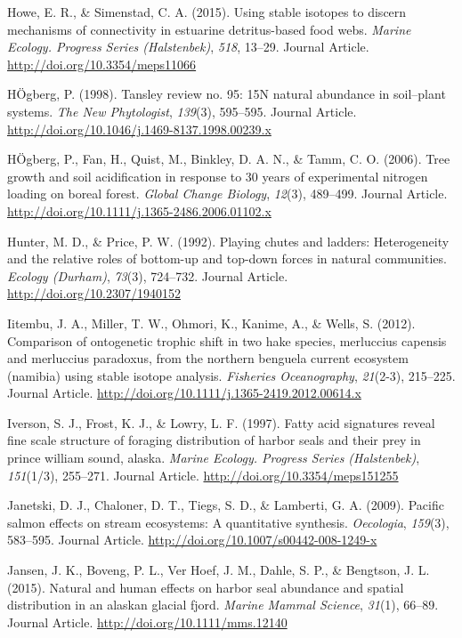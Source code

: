 \documentclass [11pt, proquest] {uwthesis}[2015/03/03]
\begin{document}
\hypertarget{ref-Howe2015}{}
Howe, E. R., \& Simenstad, C. A. (2015). Using stable isotopes to
discern mechanisms of connectivity in estuarine detritus-based food
webs. \emph{Marine Ecology. Progress Series (Halstenbek)}, \emph{518},
13--29. Journal Article. \url{http://doi.org/10.3354/meps11066}

\hypertarget{ref-Hogberg1998}{}
HÖgberg, P. (1998). Tansley review no. 95: 15N natural abundance in
soil--plant systems. \emph{The New Phytologist}, \emph{139}(3),
595--595. Journal Article.
\url{http://doi.org/10.1046/j.1469-8137.1998.00239.x}

\hypertarget{ref-Hogberg2006}{}
HÖgberg, P., Fan, H., Quist, M., Binkley, D. A. N., \& Tamm, C. O.
(2006). Tree growth and soil acidification in response to 30 years of
experimental nitrogen loading on boreal forest. \emph{Global Change
Biology}, \emph{12}(3), 489--499. Journal Article.
\url{http://doi.org/10.1111/j.1365-2486.2006.01102.x}

\hypertarget{ref-Hunter1992}{}
Hunter, M. D., \& Price, P. W. (1992). Playing chutes and ladders:
Heterogeneity and the relative roles of bottom-up and top-down forces in
natural communities. \emph{Ecology (Durham)}, \emph{73}(3), 724--732.
Journal Article. \url{http://doi.org/10.2307/1940152}

\hypertarget{ref-Iitembu2012}{}
Iitembu, J. A., Miller, T. W., Ohmori, K., Kanime, A., \& Wells, S.
(2012). Comparison of ontogenetic trophic shift in two hake species,
merluccius capensis and merluccius paradoxus, from the northern benguela
current ecosystem (namibia) using stable isotope analysis.
\emph{Fisheries Oceanography}, \emph{21}(2-3), 215--225. Journal
Article. \url{http://doi.org/10.1111/j.1365-2419.2012.00614.x}

\hypertarget{ref-Iverson1997}{}
Iverson, S. J., Frost, K. J., \& Lowry, L. F. (1997). Fatty acid
signatures reveal fine scale structure of foraging distribution of
harbor seals and their prey in prince william sound, alaska.
\emph{Marine Ecology. Progress Series (Halstenbek)}, \emph{151}(1/3),
255--271. Journal Article. \url{http://doi.org/10.3354/meps151255}

\hypertarget{ref-Janetski2009}{}
Janetski, D. J., Chaloner, D. T., Tiegs, S. D., \& Lamberti, G. A.
(2009). Pacific salmon effects on stream ecosystems: A quantitative
synthesis. \emph{Oecologia}, \emph{159}(3), 583--595. Journal Article.
\url{http://doi.org/10.1007/s00442-008-1249-x}

\hypertarget{ref-Jansen2015}{}
Jansen, J. K., Boveng, P. L., Ver Hoef, J. M., Dahle, S. P., \&
Bengtson, J. L. (2015). Natural and human effects on harbor seal
abundance and spatial distribution in an alaskan glacial fjord.
\emph{Marine Mammal Science}, \emph{31}(1), 66--89. Journal Article.
\url{http://doi.org/10.1111/mms.12140}
\end{document}
